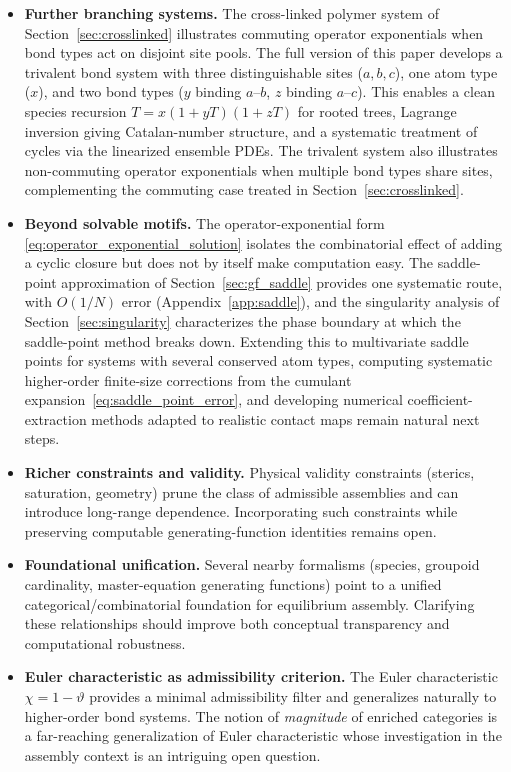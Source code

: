 \documentclass[11pt]{amsart}
\theoremstyle{definition}
\theoremstyle{plain}
\theoremstyle{remark}
\begin{document}
\begin{itemize}
  \item \textbf{Further branching systems.} The cross-linked polymer system of Section~\ref{sec:crosslinked} illustrates commuting operator exponentials when bond types act on disjoint site pools.
  The full version of this paper develops a trivalent bond system with three distinguishable sites ($a, b, c$), one atom type ($x$), and two bond types ($y$ binding $a$--$b$, $z$ binding $a$--$c$).
  This enables a clean species recursion $T = x(1+yT)(1+zT)$ for rooted trees, Lagrange inversion giving Catalan-number structure, and a systematic treatment of cycles via the linearized ensemble PDEs.
  The trivalent system also illustrates non-commuting operator exponentials when multiple bond types share sites, complementing the commuting case treated in Section~\ref{sec:crosslinked}.

  \item \textbf{Beyond solvable motifs.} The operator-exponential form \eqref{eq:operator_exponential_solution} isolates the combinatorial effect of adding a cyclic closure but does not by itself make computation easy. The saddle-point approximation of Section~\ref{sec:gf_saddle} provides one systematic route, with $O(1/N)$ error (Appendix~\ref{app:saddle}), and the singularity analysis of Section~\ref{sec:singularity} characterizes the phase boundary at which the saddle-point method breaks down. Extending this to multivariate saddle points for systems with several conserved atom types, computing systematic higher-order finite-size corrections from the cumulant expansion~\eqref{eq:saddle_point_error}, and developing numerical coefficient-extraction methods adapted to realistic contact maps remain natural next steps.

  \item \textbf{Richer constraints and validity.} Physical validity constraints (sterics, saturation, geometry) prune the class of admissible assemblies and can introduce long-range dependence. Incorporating such constraints while preserving computable generating-function identities remains open.

  \item \textbf{Foundational unification.} Several nearby formalisms (species, groupoid cardinality, master-equation generating functions) point to a unified categorical/combinatorial foundation for equilibrium assembly. Clarifying these relationships should improve both conceptual transparency and computational robustness.

  \item \textbf{Euler characteristic as admissibility criterion.} The Euler characteristic $\chi = 1 - \vartheta$ provides a minimal admissibility filter and generalizes naturally to higher-order bond systems. The notion of \emph{magnitude} of enriched categories \cite{leinster2008euler} is a far-reaching generalization of Euler characteristic whose investigation in the assembly context is an intriguing open question.
\end{itemize}
\end{document}
